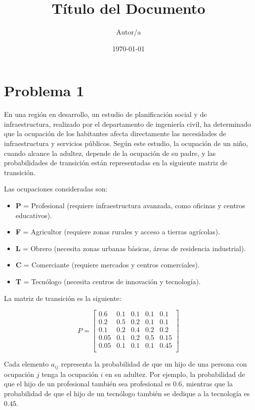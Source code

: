\documentclass{article}  %
\title{Título del Documento}  %
\author{Autor/a}  %
\date{\today}  %
\begin{document}
\maketitle  %





\section*{Problema 1}

En una región en desarrollo, un estudio de planificación social y de infraestructura, realizado por el departamento de ingeniería civil, ha determinado que la ocupación de los habitantes afecta directamente las necesidades de infraestructura y servicios públicos. Según este estudio, la ocupación de un niño, cuando alcance la adultez, depende de la ocupación de su padre, y las probabilidades de transición están representadas en la siguiente matriz de transición.

Las ocupaciones consideradas son:
\begin{itemize}
    \item \textbf{P} = Profesional (requiere infraestructura avanzada, como oficinas y centros educativos).
    \item \textbf{F} = Agricultor (requiere zonas rurales y acceso a tierras agrícolas).
    \item \textbf{L} = Obrero (necesita zonas urbanas básicas, áreas de residencia industrial).
    \item \textbf{C} = Comerciante (requiere mercados y centros comerciales).
    \item \textbf{T} = Tecnólogo (necesita centros de innovación y tecnología).
\end{itemize}

La matriz de transición es la siguiente:

\[
P = 
\begin{bmatrix}
0.6 & 0.1 & 0.1 & 0.1 & 0.1 \\
0.2 & 0.5 & 0.2 & 0.1 & 0.1 \\
0.1 & 0.2 & 0.4 & 0.2 & 0.2 \\
0.05 & 0.1 & 0.2 & 0.5 & 0.15 \\
0.05 & 0.1 & 0.1 & 0.1 & 0.45 \\
\end{bmatrix}
\]

Cada elemento \( a_{ij} \) representa la probabilidad de que un hijo de una persona con ocupación \( j \) tenga la ocupación \( i \) en su adultez. Por ejemplo, la probabilidad de que el hijo de un profesional también sea profesional es \(0.6\), mientras que la probabilidad de que el hijo de un tecnólogo también se dedique a la tecnología es \(0.45\).
\end{document}

